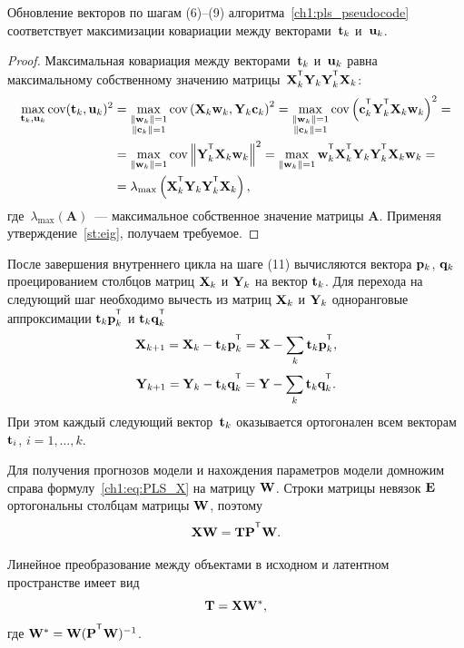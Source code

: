 \begin{statement}
	Обновление векторов по шагам (6)--(9) алгоритма~\ref{ch1:pls_pseudocode} соответствует максимизации ковариации между векторами~$\mathbf{t}_k$ и~$\mathbf{u}_k$.
\end{statement}
\begin{proof}
	Максимальная ковариация между векторами~$\mathbf{t}_k$ и~$\mathbf{u}_k$ равна максимальному собственному значению матрицы~$\bX_k^{\T} \bY_k \bY_k^{\T} \bX_k$:
	\begin{align*}
		\max_{\bt_k, \bu_k}  \text{cov} (\bt_k, \bu_k)^2 &= \max_{\substack{\|\bw_k\|=1 \\ \|\bc_k\| = 1}} \text{cov} \left( \bX_k \bw_k, \bY_k \bc_k \right)^2 = \max_{\substack{\|\bw_k\|=1 \\ \|\bc_k\| = 1}} \text{cov} \left(\bc_k^{\T}  \bY_k^{\T} \bX_k \bw_k \right)^2 = \\
		&= \max_{\|\bw_k\| = 1} \text{cov} \left\|\bY_k^{\T} \bX_k \bw_k \right\|^2 = \max_{\|\bw_k\| = 1} \bw_k^{\T} \bX_k^{\T} \bY_k \bY_k^{\T} \bX_k \bw_k = \\
		& = \lambda_{\max} \left( \bX_k^{\T} \bY_k \bY_k^{\T} \bX_k \right),
	\end{align*}
	где~$\lambda_{\max} (\mathbf{A})$~--- максимальное собственное значение матрицы $\mathbf{A}$.
	Применяя утверждение~\ref{st:eig}, получаем требуемое.
\end{proof}

После завершения внутреннего цикла на шаге (11) вычисляются вектора $\mathbf{p}_k$, $\mathbf{q}_k$ проецированием столбцов матриц $\mathbf{X}_k$ и $\mathbf{Y}_k$ на вектор $\mathbf{t}_k$. 
Для перехода на следующий шаг необходимо вычесть из матриц $\mathbf{X}_k$ и $\mathbf{Y}_k$ одноранговые аппроксимации $\bt_k \bp_k^{\T}$ и $\bt_k \bq_k^{\T}$
\begin{equation*}
	\bX_{k + 1} = \bX_{k} - \bt_k \bp_k^{\T} = \bX - \sum_k \bt_k \bp_k^{\T},
\end{equation*}
\begin{equation*}
	\bY_{k + 1} = \bY_{k} - \bt_k \bq_k^{\T} = \bY - \sum_k \bt_k \bq_k^{\T}.
\end{equation*}
При этом каждый следующий вектор~$\mathbf{t}_k$ оказывается ортогонален всем векторам~$\mathbf{t}_i$, $i=1, \dots, k$.

Для получения прогнозов модели и нахождения параметров модели 
домножим справа формулу~\eqref{ch1:eq:PLS_X} на матрицу $\mathbf{W}$. Строки матрицы невязок $\mathbf{E}$ ортогональны столбцам матрицы $\mathbf{W}$, поэтому 
\[
\bX \bW = \bT \bP^{\T} \bW.
\] 

Линейное преобразование между объектами в исходном и латентном пространстве имеет вид
\begin{equation}
	\mathbf{T} = \mathbf{X} \mathbf{W}^*,
	\label{ch1:eq:W*}
\end{equation}
где $\bW^* = \bW (\bP^{\T} \bW)^{-1}$. 

